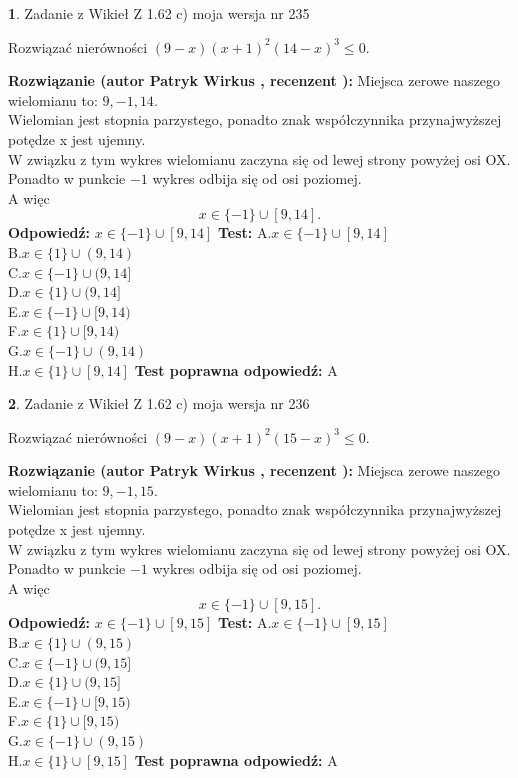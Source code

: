 \documentclass[12pt, a4paper]{article}
\theoremstyle{definition} %
\newtheorem{zad}{}
\newcommand{\zadStart}[1]{\begin{zad}#1\newline}
\newcommand{\zadStop}{\end{zad}}
\newcommand{\rozwStart}[2]{\noindent \textbf{Rozwiązanie (autor #1 , recenzent #2): }\newline}
\newcommand{\rozwStop}{\newline}
\newcommand{\odpStart}{\noindent \textbf{Odpowiedź:}\newline}
\newcommand{\odpStop}{\newline}
\newcommand{\testStart}{\noindent \textbf{Test:}\newline}
\newcommand{\testStop}{\newline}
\newcommand{\kluczStart}{\noindent \textbf{Test poprawna odpowiedź:}\newline}
\newcommand{\kluczStop}{\newline}
\begin{document}
\zadStart{Zadanie z Wikieł Z 1.62 c) moja wersja nr 235}

Rozwiązać nierówności $(9-x)(x+1)^{2}(14-x)^{3}\le0$.
\zadStop
\rozwStart{Patryk Wirkus}{}
Miejsca zerowe naszego wielomianu to: $9, -1, 14$.\\
Wielomian jest stopnia parzystego, ponadto znak współczynnika przy\linebreak najwyższej potędze x jest ujemny.\\ W związku z tym wykres wielomianu zaczyna się od lewej strony powyżej osi OX.\\
Ponadto w punkcie $-1$ wykres odbija się od osi poziomej.\\
A więc $$x \in \{-1\} \cup [9,14].$$
\rozwStop
\odpStart
$x \in \{-1\} \cup [9,14]$
\odpStop
\testStart
A.$x \in \{-1\} \cup [9,14]$\\
B.$x \in \{1\} \cup (9,14)$\\
C.$x \in \{-1\} \cup (9,14]$\\
D.$x \in \{1\} \cup (9,14]$\\
E.$x \in \{-1\} \cup [9,14)$\\
F.$x \in \{1\} \cup [9,14)$\\
G.$x \in \{-1\} \cup (9,14)$\\
H.$x \in \{1\} \cup [9,14]$
\testStop
\kluczStart
A
\kluczStop



\zadStart{Zadanie z Wikieł Z 1.62 c) moja wersja nr 236}

Rozwiązać nierówności $(9-x)(x+1)^{2}(15-x)^{3}\le0$.
\zadStop
\rozwStart{Patryk Wirkus}{}
Miejsca zerowe naszego wielomianu to: $9, -1, 15$.\\
Wielomian jest stopnia parzystego, ponadto znak współczynnika przy\linebreak najwyższej potędze x jest ujemny.\\ W związku z tym wykres wielomianu zaczyna się od lewej strony powyżej osi OX.\\
Ponadto w punkcie $-1$ wykres odbija się od osi poziomej.\\
A więc $$x \in \{-1\} \cup [9,15].$$
\rozwStop
\odpStart
$x \in \{-1\} \cup [9,15]$
\odpStop
\testStart
A.$x \in \{-1\} \cup [9,15]$\\
B.$x \in \{1\} \cup (9,15)$\\
C.$x \in \{-1\} \cup (9,15]$\\
D.$x \in \{1\} \cup (9,15]$\\
E.$x \in \{-1\} \cup [9,15)$\\
F.$x \in \{1\} \cup [9,15)$\\
G.$x \in \{-1\} \cup (9,15)$\\
H.$x \in \{1\} \cup [9,15]$
\testStop
\kluczStart
A
\kluczStop
\end{document}
